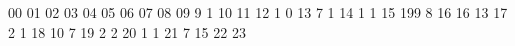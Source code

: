 00
01
02
03
04
05
06
07
08
09 9 1
10
11
12 1 0
13 7 1
14 1 1
15 199 8
16 16 13
17 2 1
18 10 7
19 2 2
20 1 1
21 7 15
22
23

